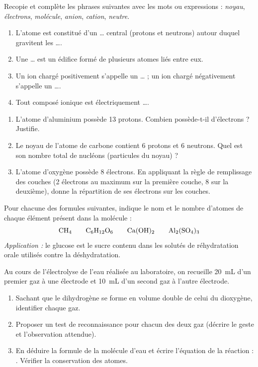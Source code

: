 \documentclass[11pt]{article}
\newcounter{popsec}
\newcounter{popsub}
\newcommand{\courssub}[1]{%
  \stepcounter{popsub}%
  \par\vspace{9pt}\noindent{\popxbold\fontsize{11.5}{13}\selectfont\color{popink}{\color{poporange}\thepopsec.\thepopsub}\hspace{6pt}#1}\par\nopagebreak\vspace{4pt}
}
\begin{document}
\begin{exercice}
Recopie et complète les phrases suivantes avec les mots ou expressions : \emph{noyau}, \emph{électrons}, \emph{molécule}, \emph{anion}, \emph{cation}, \emph{neutre}.
\begin{enumerate}
\item L'atome est constitué d'un \ldots{} central (protons et neutrons) autour duquel gravitent les \ldots{}.
\item Une \ldots{} est un édifice formé de plusieurs atomes liés entre eux.
\item Un ion chargé positivement s'appelle un \ldots{} ; un ion chargé négativement s'appelle un \ldots{}.
\item Tout composé ionique est électriquement \ldots{}.
\end{enumerate}
\end{exercice}

\begin{exercice}
\begin{enumerate}
\item L'atome d'aluminium possède 13 protons. Combien possède-t-il d'électrons ? Justifie.
\item Le noyau de l'atome de carbone contient 6 protons et 6 neutrons. Quel est son nombre total de nucléons (particules du noyau) ?
\item L'atome d'oxygène possède 8 électrons. En appliquant la règle de remplissage des couches (2 électrons au maximum sur la première couche, 8 sur la deuxième), donne la répartition de ses électrons sur les couches.
\end{enumerate}
\end{exercice}

\courssub{Je m'entraîne}

\begin{exercice}
Pour chacune des formules suivantes, indique le nom et le nombre d'atomes de chaque élément présent dans la molécule :
\[\ce{CH4} \qquad \ce{C6H12O6} \qquad \ce{Ca(OH)2} \qquad \ce{Al2(SO4)3}\]
\emph{Application :} le glucose  est le sucre contenu dans les solutés de réhydratation orale utilisés contre la déshydratation.
\end{exercice}

\begin{exercice}
Au cours de l'électrolyse de l'eau réalisée au laboratoire, on recueille \SI{20}{mL} d'un premier gaz à une électrode et \SI{10}{mL} d'un second gaz à l'autre électrode.
\begin{enumerate}
\item Sachant que le dihydrogène se forme en volume double de celui du dioxygène, identifier chaque gaz.
\item Proposer un test de reconnaissance pour chacun des deux gaz (décrire le geste et l'observation attendue).
\item En déduire la formule de la molécule d'eau et écrire l'équation de la réaction : . Vérifier la conservation des atomes.
\end{enumerate}
\end{exercice}
\end{document}
